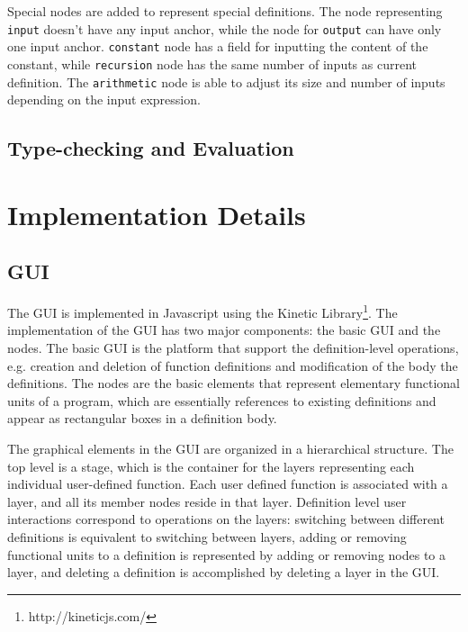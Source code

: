 \documentclass[12pt,UTF8,a4]{article}
\newcommand{\code}[1]{\texttt{#1}}
\begin{document}
Special nodes are added to represent special definitions. The node representing \code{input} doesn't have any input anchor, while the node for \code{output} can have only one input anchor. \code{constant} node has a field for inputting the content of the constant, while \code{recursion} node has the same number of inputs as current definition. The \code{arithmetic} node is able to adjust its size and number of inputs depending on the input expression.

\subsection{Type-checking and Evaluation}



\section{Implementation Details}
\subsection{GUI}
The GUI is implemented in Javascript using the Kinetic Library\footnote{http://kineticjs.com/}. The implementation of the GUI has two major components: the basic GUI and the nodes. The basic GUI is the platform that support the definition-level operations, e.g. creation and deletion of function definitions and modification of the body the definitions. The nodes are the basic elements that represent elementary functional units of a program, which are essentially references to existing definitions and appear as rectangular boxes in a definition body. 

The graphical elements in the GUI are organized in a hierarchical structure. The top level is a stage, which is the container for the layers representing each individual user-defined function. Each user defined function is associated with a layer, and all its member nodes reside in that layer. Definition level user interactions correspond to operations on the layers: switching between different definitions is equivalent to switching between layers, adding or removing functional units to a definition is represented by adding or removing nodes to a layer, and deleting a definition is accomplished by deleting a layer in the GUI.
\end{document}

